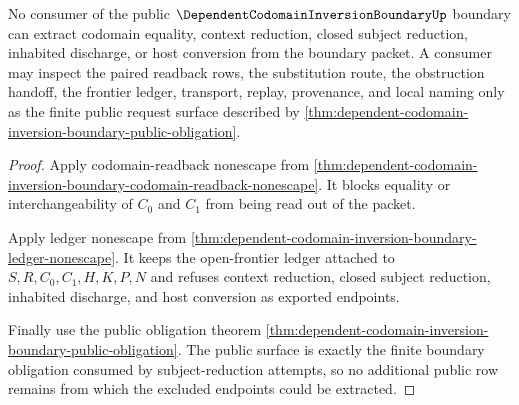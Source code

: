 \begin{theorem}
\label{thm:dependent-codomain-inversion-boundary-nonescape}
No consumer of the public $\DependentCodomainInversionBoundaryUp$ boundary can extract codomain equality, context reduction, closed subject reduction, inhabited discharge, or host conversion from the boundary packet. A consumer may inspect the paired readback rows, the substitution route, the obstruction handoff, the frontier ledger, transport, replay, provenance, and local naming only as the finite public request surface described by \autoref{thm:dependent-codomain-inversion-boundary-public-obligation}.
\end{theorem}
\begin{proof}
Apply codomain-readback nonescape from \autoref{thm:dependent-codomain-inversion-boundary-codomain-readback-nonescape}. It blocks equality or interchangeability of $C_0$ and $C_1$ from being read out of the packet.

Apply ledger nonescape from \autoref{thm:dependent-codomain-inversion-boundary-ledger-nonescape}. It keeps the open-frontier ledger attached to $S,R,C_0,C_1,H,K,P,N$ and refuses context reduction, closed subject reduction, inhabited discharge, and host conversion as exported endpoints.

Finally use the public obligation theorem \autoref{thm:dependent-codomain-inversion-boundary-public-obligation}. The public surface is exactly the finite boundary obligation consumed by subject-reduction attempts, so no additional public row remains from which the excluded endpoints could be extracted.
\end{proof}


\begin{closurestatus}{\DependentCodomainInversionBoundaryUp}
  \theoryclosure{\seedClosure}
  \formalstatus{\unformalizedV}
\end{closurestatus}
